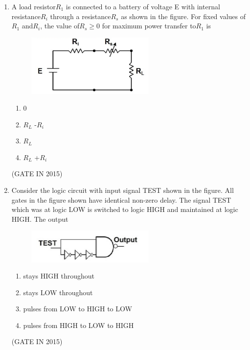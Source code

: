 \documentclass[journal]{IEEEtran}
\begin{document}
\begin{enumerate}
\item A load resistor$R_1$ is connected to a battery of voltage E with internal resistance$R_i$ through a resistance$R_s$ as shown in the figure. For fixed values of$R_1$ and$R_i$, the value of$R_s\geq0$ for maximum power transfer to$R_1$ is
\begin{figure}[H]
    \centering
      \includegraphics[width=0.6\textwidth]{5.png} 
      \caption{}
    \label{fig:fig5} 
\end{figure}
\begin{multicols}{4}
\begin{enumerate}
\item 0
\item$R_L$ -$R_i$
\item$R_L$
\item$R_L$ +$R_i$
\end{enumerate}
  \end{multicols} \hfill(GATE IN 2015)

\item Consider the logic circuit with input signal TEST shown in the figure. All gates in the figure shown have identical non-zero delay. The signal TEST which was at logic LOW is switched to logic HIGH and maintained at logic HIGH. The output
\begin{figure}[H]
    \centering
      \includegraphics[width=0.6\textwidth]{6.png} 
      \caption{}
    \label{fig:fig6} 
\end{figure}
\begin{enumerate}
\item stays HIGH throughout
\item stays LOW throughout
\item pulses from LOW to HIGH to LOW
\item pulses from HIGH to LOW to HIGH
\end{enumerate}
\hfill(GATE IN 2015)


\end{enumerate}
\end{document}
